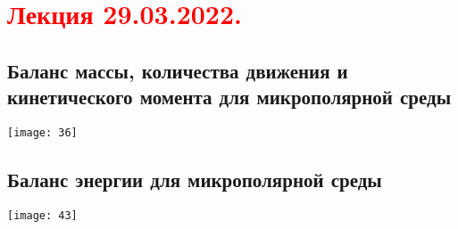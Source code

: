 \documentclass[main.tex]{subfiles}
\begin{document}
\section{\textcolor{red}{Лекция 29.03.2022.}}

\subsection{Баланс массы, количества движения и кинетического момента для микрополярной среды}
\texttt{[image: 36]}







\subsection{Баланс энергии для микрополярной среды}
\texttt{[image: 43]}

\end{document}
